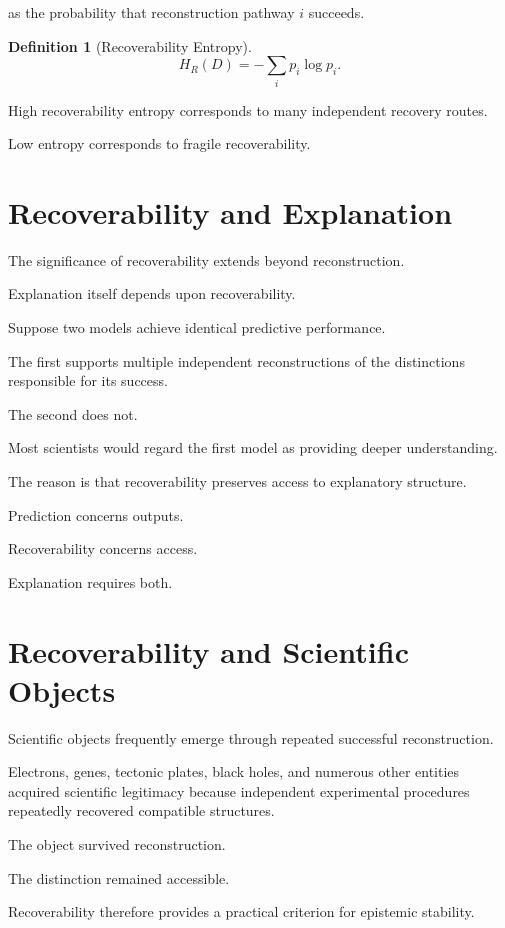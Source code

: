 \documentclass[11pt,oneside,openany]{book}
\newtheorem{definition}{Definition}[chapter] \newtheorem{theorem}{Theorem}[chapter] \newtheorem{proposition}{Proposition}[chapter] \newtheorem{lemma}{Lemma}[chapter] \newtheorem{corollary}{Corollary}[chapter] \newtheorem{remark}{Remark}[chapter]
\begin{document}
as the probability that reconstruction pathway \(i\) succeeds.

\begin{definition}[Recoverability Entropy]

\[
H_R(D)
=
-
\sum_i
p_i
\log p_i.
\]

\end{definition}

High recoverability entropy corresponds to many independent recovery routes.

Low entropy corresponds to fragile recoverability.

\section{Recoverability and Explanation}

The significance of recoverability extends beyond reconstruction.

Explanation itself depends upon recoverability.

Suppose two models achieve identical predictive performance.

The first supports multiple independent reconstructions of the distinctions responsible for its success.

The second does not.

Most scientists would regard the first model as providing deeper understanding.

The reason is that recoverability preserves access to explanatory structure.

Prediction concerns outputs.

Recoverability concerns access.

Explanation requires both.

\section{Recoverability and Scientific Objects}

Scientific objects frequently emerge through repeated successful reconstruction.

Electrons, genes, tectonic plates, black holes, and numerous other entities acquired scientific legitimacy because independent experimental procedures repeatedly recovered compatible structures.

The object survived reconstruction.

The distinction remained accessible.

Recoverability therefore provides a practical criterion for epistemic stability.
\end{document}
